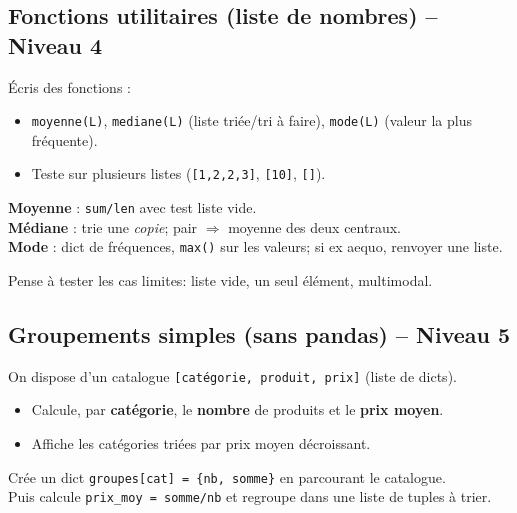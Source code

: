 \documentclass[11pt,a4paper]{article}
\begin{document}
\subsection*{Fonctions utilitaires (liste de nombres) -- Niveau 4}
Écris des fonctions :
\begin{itemize}
    \item \texttt{moyenne(L)}, \texttt{mediane(L)} (liste triée/tri à faire), \texttt{mode(L)} (valeur la plus fréquente).
    \item Teste sur plusieurs listes (\texttt{[1,2,2,3]}, \texttt{[10]}, \texttt{[]}).
\end{itemize}
\begin{tcolorbox}[title=Aide]
\textbf{Moyenne} : \texttt{sum/len} avec test liste vide.\\
\textbf{Médiane} : trie une \emph{copie}; pair $\Rightarrow$ moyenne des deux centraux.\\
\textbf{Mode} : dict de fréquences, \texttt{max()} sur les valeurs; si ex aequo, renvoyer une liste.
\end{tcolorbox}
\begin{tcolorbox}[title=Bonus -- Aide]
Pense à tester les cas limites: liste vide, un seul élément, multimodal.
\end{tcolorbox}

\subsection*{Groupements simples (sans pandas) -- Niveau 5}
On dispose d'un catalogue \texttt{[{catégorie, produit, prix}]} (liste de dicts).
\begin{itemize}
    \item Calcule, par \textbf{catégorie}, le \textbf{nombre} de produits et le \textbf{prix moyen}.
    \item Affiche les catégories triées par prix moyen décroissant.
\end{itemize}
\begin{tcolorbox}[title=Aide]
Crée un dict \texttt{groupes[cat] = \{nb, somme\}} en parcourant le catalogue.\\
Puis calcule \texttt{prix\_moy = somme/nb} et regroupe dans une liste de tuples à trier.
\end{tcolorbox}
\end{document}
